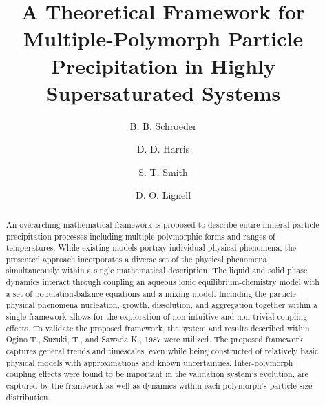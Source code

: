 \documentclass[preprint,3p,a4paper,times,12pt,authoryear]{elsarticle}
\begin{document}
\linenumbers
\begin{frontmatter}

\title{A Theoretical Framework for Multiple-Polymorph Particle Precipitation in Highly Supersaturated Systems}
\author[uu]{B. B. Schroeder}
\author[byu]{D. D. Harris}
\author[uu]{S. T. Smith}
\author[byu]{D. O. Lignell}


\address[uu]{Institute for Clean and Secure Energy, Department of Chemical Engineering, \\
 University of Utah, Salt Lake City, UT 84112, USA}
\address[byu]{Department of Chemical Engineering, Brigham Young University, Provo, UT 84602, USA}

\begin{linenomath*}
\begin{abstract}
An overarching mathematical framework is proposed to describe entire mineral particle precipitation processes including multiple polymorphic forms and ranges of temperatures.  While existing models portray individual physical phenomena, the presented approach incorporates a diverse set of the physical phenomena simultaneously within a single mathematical description.  The liquid and solid phase dynamics interact through coupling an aqueous ionic equilibrium-chemistry model with a set of population-balance equations and a mixing model.  Including the particle physical phenomena nucleation, growth, dissolution, and aggregation together within a single framework allows for the exploration of non-intuitive and non-trivial coupling effects.  To validate the proposed framework, the  system and results described within Ogino T., Suzuki, T., and Sawada K., 1987 were utilized.  The proposed framework captures general trends and timescales, even while being constructed of relatively basic physical models with approximations and known uncertainties.  Inter-polymorph coupling effects were found to be important in the validation system's evolution, are captured by the framework as well as dynamics within each polymorph's particle size distribution.  
\end{abstract}
\end{linenomath*}

\end{frontmatter}
\end{document}
